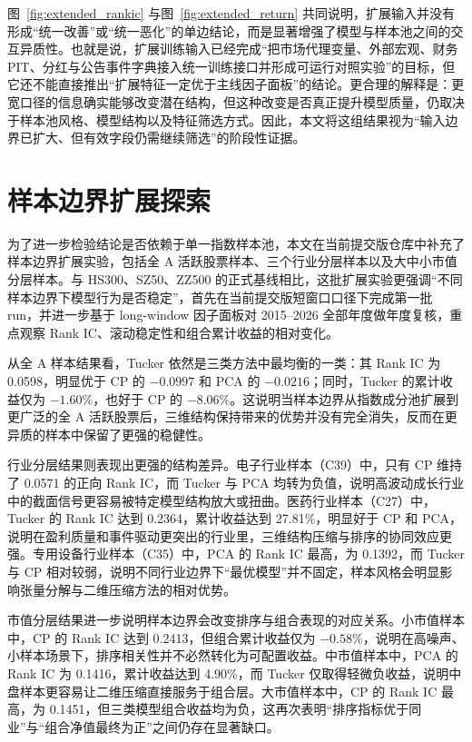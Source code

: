 图~\ref{fig:extended_rankic} 与图~\ref{fig:extended_return} 共同说明，扩展输入并没有形成“统一改善”或“统一恶化”的单边结论，而是显著增强了模型与样本池之间的交互异质性。也就是说，扩展训练输入已经完成“把市场代理变量、外部宏观、财务 PIT、分红与公告事件字典接入统一训练接口并形成可运行对照实验”的目标，但它还不能直接推出“扩展特征一定优于主线因子面板”的结论。更合理的解释是：更宽口径的信息确实能够改变潜在结构，但这种改变是否真正提升模型质量，仍取决于样本池风格、模型结构以及特征筛选方式。因此，本文将这组结果视为“输入边界已扩大、但有效字段仍需继续筛选”的阶段性证据。

\section{样本边界扩展探索}

为了进一步检验结论是否依赖于单一指数样本池，本文在当前提交版仓库中补充了样本边界扩展实验，包括全 A 活跃股票样本、三个行业分层样本以及大中小市值分层样本。与 HS300、SZ50、ZZ500 的正式基线相比，这批扩展实验更强调“不同样本边界下模型行为是否稳定”，首先在当前提交版短窗口口径下完成第一批 run，并进一步基于 long-window 因子面板对 2015--2026 全部年度做年度复核，重点观察 Rank IC、滚动稳定性和组合累计收益的相对变化。

从全 A 样本结果看，Tucker 依然是三类方法中最均衡的一类：其 Rank IC 为 0.0598，明显优于 CP 的 $-0.0997$ 和 PCA 的 $-0.0216$；同时，Tucker 的累计收益仅为 $-1.60\%$，也好于 CP 的 $-8.06\%$。这说明当样本边界从指数成分池扩展到更广泛的全 A 活跃股票后，三维结构保持带来的优势并没有完全消失，反而在更异质的样本中保留了更强的稳健性。

行业分层结果则表现出更强的结构差异。电子行业样本（C39）中，只有 CP 维持了 0.0571 的正向 Rank IC，而 Tucker 与 PCA 均转为负值，说明高波动成长行业中的截面信号更容易被特定模型结构放大或扭曲。医药行业样本（C27）中，Tucker 的 Rank IC 达到 0.2364，累计收益达到 27.81\%，明显好于 CP 和 PCA，说明在盈利质量和事件驱动更突出的行业里，三维结构压缩与排序的协同效应更强。专用设备行业样本（C35）中，PCA 的 Rank IC 最高，为 0.1392，而 Tucker 与 CP 相对较弱，说明不同行业边界下“最优模型”并不固定，样本风格会明显影响张量分解与二维压缩方法的相对优势。

市值分层结果进一步说明样本边界会改变排序与组合表现的对应关系。小市值样本中，CP 的 Rank IC 达到 0.2413，但组合累计收益仅为 $-0.58\%$，说明在高噪声、小样本场景下，排序相关性并不必然转化为可配置收益。中市值样本中，PCA 的 Rank IC 为 0.1416，累计收益达到 4.90\%，而 Tucker 仅取得轻微负收益，说明中盘样本更容易让二维压缩直接服务于组合层。大市值样本中，CP 的 Rank IC 最高，为 0.1451，但三类模型组合收益均为负，这再次表明“排序指标优于同业”与“组合净值最终为正”之间仍存在显著缺口。

